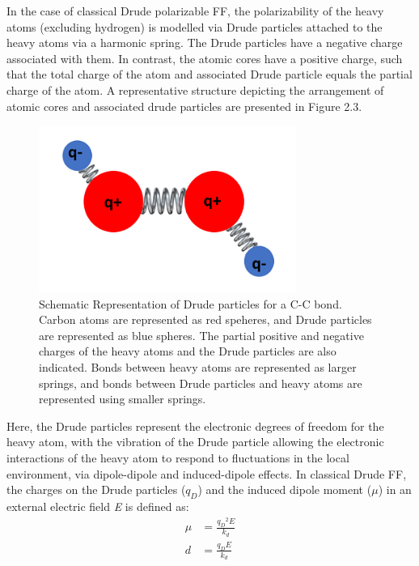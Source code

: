     In the case of classical Drude polarizable FF, the polarizability of the heavy atoms (excluding hydrogen) is modelled via Drude particles attached to the heavy atoms via a harmonic spring. The Drude particles have a negative charge associated with them. In contrast, the atomic cores have a positive charge, such that the total charge of the atom and associated Drude particle equals the partial charge of the atom. A representative structure depicting the arrangement of atomic cores and associated drude particles are presented in Figure 2.3. 
    \begin{figure}
        \centering
        \includegraphics[width=0.75\textwidth]{Methods/Figures/drude.png}
        \caption[Schematic Representation of Drude particles for a C-C bond]{Schematic Representation of Drude particles for a C-C bond. Carbon atoms are represented as red speheres, and Drude particles are represented as blue spheres. The partial positive and negative charges of the heavy atoms and the Drude particles are also indicated. Bonds between heavy atoms are represented as larger springs, and bonds between Drude particles and heavy atoms are represented using smaller springs.}
    \end{figure}

    Here, the Drude particles represent the electronic degrees of freedom for the heavy atom, with the vibration of the Drude particle allowing the electronic interactions of the heavy atom to respond to fluctuations in the local environment, via dipole-dipole and induced-dipole effects. In classical Drude FF, the charges on the Drude particles ($q_D$) and the induced dipole moment ($\mu$) in an external electric field \textit{E} is defined as:
     \begin{align*}
        \mu &= \frac{{q_D}^2 E}{k_d}\\
        d &= \frac{q_D E}{k_d}
     \end{align*}

